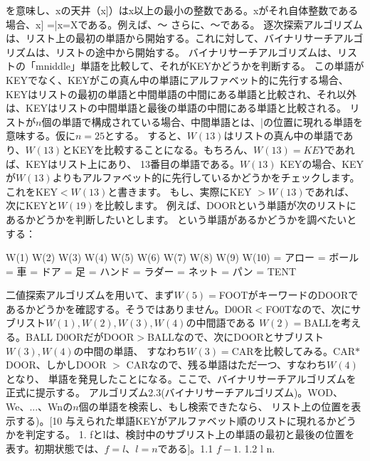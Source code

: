 
を意味し、xの天井（x]）はx以上の最小の整数である。xがそれ自体整数である場合、x] =|x=Xである。例えば、～ さらに、～である。
逐次探索アルゴリズムは、リスト上の最初の単語から開始する。これに対して、バイナリサーチアルゴリズムは、リストの途中から開始する。
バイナリサーチアルゴリズムは、リストの「mniddle」単語を比較して、それがKEYかどうかを判断する。 この単語がKEYでなく、KEYがこの真ん中の単語にアルファベット的に先行する場合、
KEYはリストの最初の単語と中間単語の中間にある単語と比較され、それ以外は、KEYはリストの中間単語と最後の単語の中間にある単語と比較される。
リストが$n$個の単語で構成されている場合、中間単語とは、|の位置に現れる単語を意味する。仮に$n=25$とする。
すると、$W(13)$はリストの真ん中の単語であり、$W(13)$とKEYを比較することになる。もちろん、$W(13)=KEY$であれば、KEYはリスト上にあり、
13番目の単語である。$W(13)$ KEYの場合、KEYが$W(13)$よりもアルファベット的に先行しているかどうかをチェックします。これをKEY$< W(13)$と書きます。
もし、実際にKEY $> W(13)$であれば、次にKEYと$W(19)$を比較します。
例えば、DOORという単語が次のリストにあるかどうかを判断したいとします。
という単語があるかどうかを調べたいとする：

W(1)
W(2)
W(3)
W(4)
W(5)
W(6)
W(7)
W(8)
W(9)
W(10)
= アロー
= ボール
= 車
= ドア
= 足
= ハンド
= ラダー
= ネット
= パン
= TENT

二値探索アルゴリズムを用いて、まず$W(5)=$FOOTがキーワードのDOORであるかどうかを確認する。そうではありません。D0OR$<$FO0Tなので、次にサブリスト$W(1), W(2), W(3), W(4)$の中間語である
$W(2) = $BALLを考える。BALL D0ORだがDOOR$>$BALLなので、次にDOORとサブリスト$W(3), W(4)$の中間の単語、
すなわち$W(3)=$CARを比較してみる。CAR$*$DOOR、しかしDOOR $>$ CARなので、残る単語はただ一つ、すなわち$W(4)$となり、
単語を発見したことになる。ここで、バイナリサーチアルゴリズムを正式に提示する。
アルゴリズム2.3(バイナリサーチアルゴリズム)。WOD、We、...、Wnの$n$個の単語を検索し、もし検索できたなら、
リスト上の位置を表示する)。[10 与えられた単語KEYがアルファベット順のリストに現れるかどうかを判定する。
1. fとlは、検討中のサブリスト上の単語の最初と最後の位置を表す。初期状態では、$f=l$、$l=n$である]。1.1 $f-1$.
1.2 l n.
